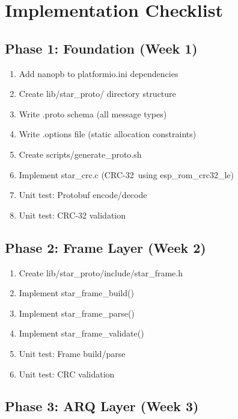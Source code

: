 \section{Implementation Checklist}

\subsection{Phase 1: Foundation (Week 1)}

\begin{enumerate}[label=\protect\checkbox]
    \item Add nanopb to platformio.ini dependencies
    \item Create lib/star\_proto/ directory structure
    \item Write .proto schema (all message types)
    \item Write .options file (static allocation constraints)
    \item Create scripts/generate\_proto.sh
    \item Implement star\_crc.c (CRC-32~using esp\_rom\_crc32\_le)
    \item Unit test: Protobuf encode/decode
    \item Unit test: CRC-32 validation
\end{enumerate}

\subsection{Phase 2: Frame Layer (Week 2)}

\begin{enumerate}[label=\protect\checkbox]
    \item Create lib/star\_proto/include/star\_frame.h
    \item Implement star\_frame\_build()
    \item Implement star\_frame\_parse()
    \item Implement star\_frame\_validate()
    \item Unit test: Frame build/parse
    \item Unit test: CRC validation
\end{enumerate}

\subsection{Phase 3: ARQ Layer (Week 3)}

